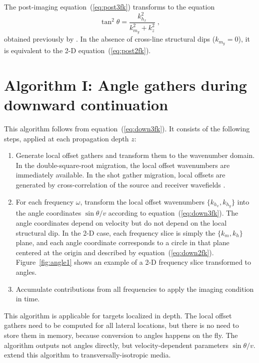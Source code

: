 The post-imaging equation~(\ref{eq:post3fk}) transforms to the equation
\begin{equation}
  \label{eq:postcafk}
  \tan^2{\theta} = \frac{k_{h_x}^2}{k_{m_y}^2 + k_z^2}\;,
\end{equation}
obtained previously by \cite{newseg}. In the absence of cross-line
structural dips ($k_{m_y}=0$), it is equivalent to the 2-D
equation~(\ref{eq:post2fk}).

\section{Algorithm I: Angle gathers during downward continuation}

This algorithm follows from equation~(\ref{eq:down3fk}). It consists of the
following steps, applied at each propagation depth $z$:
\begin{enumerate} 
\item Generate local offset gathers and transform them to the wavenumber
  domain. In the double-square-root migration, the local offset wavenumbers
  are immediately available. In the shot gather migration, local offsets are
  generated by cross-correlation of the source and receiver wavefields
  \cite[]{GEO67-03-08830889}.
\item For each frequency $\omega$, transform the local offset wavenumbers
  $\{k_{h_x},k_{h_y}\}$ into the angle coordinates $\sin{\theta}/v$ according
  to equation~(\ref{eq:down3fk}). The angle coordinates depend on velocity but
  do not depend on the local structural dip. In the 2-D case, each frequency
  slice is simply the $\{k_m,k_h\}$ plane, and each angle coordinate
  corresponds to a circle in that plane centered at the origin and described
  by equation~(\ref{eq:down2fk}). Figure~\ref{fig:angle1} shows an example of
  a 2-D frequency slice transformed to angles.
\item Accumulate contributions from all frequencies to 
  apply the imaging condition in time.
\end{enumerate}


This algorithm is applicable for targets localized in depth. The local
offset gathers need to be computed for all lateral locations, but
there is no need to store them in memory, because conversion to angles
happens on the fly. The algorithm outputs not angles directly, but
velocity-dependent parameters $\sin{\theta}/v$. \cite{tariq} extend
this algorithm to transversally-isotropic media.

